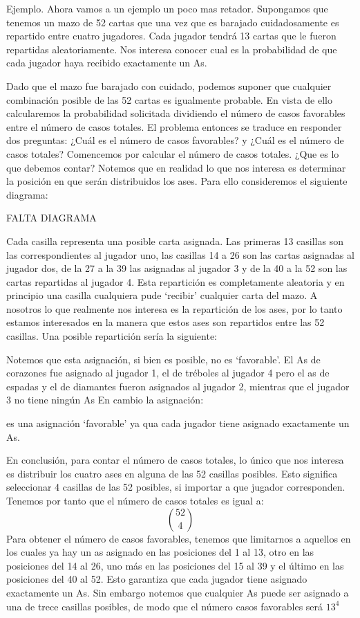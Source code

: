 \documentclass[14pt]{extreport}
\theoremstyle{definicion}
\theoremstyle{propiedad}
\begin{document}
Ejemplo. Ahora vamos a un ejemplo un poco mas retador. Supongamos que tenemos un mazo de 52 cartas que una vez que es barajado cuidadosamente es repartido entre cuatro jugadores. Cada jugador tendrá 13 cartas que le fueron repartidas aleatoriamente. Nos interesa conocer cual es la probabilidad de que cada jugador haya recibido exactamente un As.

Dado que el mazo fue barajado con cuidado, podemos suponer que cualquier combinación posible de las 52 cartas es igualmente probable. En vista de ello calcularemos la probabilidad solicitada dividiendo el número de casos favorables entre el número de casos totales. El problema entonces se traduce en responder dos preguntas: ¿Cuál es el número de casos favorables? y ¿Cuál es el número de casos totales? Comencemos por calcular el número de casos totales. ¿Que es lo que debemos contar? Notemos que en realidad lo que nos interesa es determinar la posición en que serán distribuidos los ases. Para ello consideremos el siguiente diagrama:

\begin{center}
  FALTA DIAGRAMA
\end{center}

Cada casilla representa una posible carta asignada. Las primeras 13 casillas son las correspondientes al jugador uno, las casillas 14 a 26 son las cartas asignadas al jugador dos, de la 27 a la 39 las asignadas al jugador 3 y de la 40 a la 52 son las cartas repartidas al jugador 4. Esta repartición es completamente aleatoria y en principio una casilla cualquiera pude `recibir' cualquier carta del mazo. A nosotros lo que realmente nos interesa es la repartición de los ases, por lo tanto estamos interesados en la manera que estos ases son repartidos entre las 52 casillas. Una posible repartición sería la siguiente:


Notemos que esta asignación, si bien es posible, no es `favorable'. El As de corazones fue asignado al jugador 1, el de tréboles al jugador 4 pero el as de espadas y el de diamantes fueron asignados al jugador 2, mientras que el jugador 3 no tiene ningún As En cambio la asignación:

es una asignación `favorable' ya qua cada jugador tiene asignado exactamente un As.

En conclusión, para contar el número de casos totales, lo único que nos interesa es distribuir los cuatro ases en alguna de las 52 casillas posibles. Esto significa seleccionar 4 casillas de las 52 posibles, si importar a que jugador corresponden. Tenemos por tanto que el número de casos totales es igual a:
$$
  \binom{52}{4}
$$
Para obtener el número de casos favorables, tenemos que limitarnos a aquellos en los cuales ya hay un as asignado en las posiciones del 1 al 13, otro en las posiciones del 14 al 26, uno más en las posiciones del 15 al 39 y el último en las posiciones del 40 al 52. Esto garantiza que cada jugador tiene asignado exactamente un As. Sin embargo notemos que cualquier As puede ser asignado a una de trece casillas posibles, de modo que el número casos favorables será $13^4$
\end{document}
